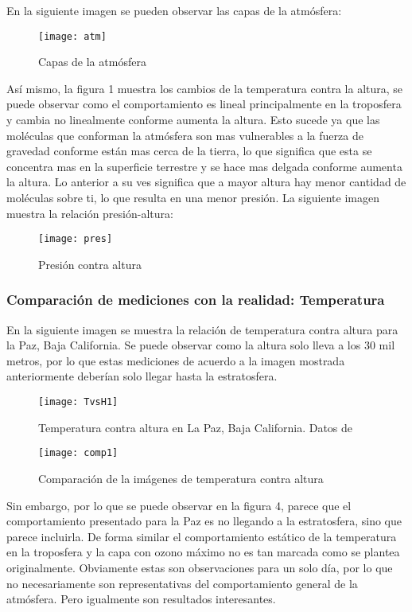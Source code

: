 \documentclass[12pt,letterpaper]{article}
\begin{document}
En la siguiente imagen se pueden observar las capas de la atmósfera:

\begin{figure}[H]
	\centering
	\texttt{[image: atm]}
	\caption{Capas de la atmósfera \cite{a}}
\end{figure}

Así mismo, la figura 1 muestra los cambios de la temperatura contra la altura, se puede observar como el comportamiento es lineal principalmente en la troposfera y cambia no linealmente conforme aumenta la altura. Esto sucede ya que las moléculas que conforman la atmósfera son mas vulnerables a la fuerza de gravedad conforme están mas cerca de la tierra, lo que significa que esta se concentra mas en la superficie terrestre y se hace mas delgada conforme aumenta la altura\cite{a}. Lo anterior a su ves significa que a mayor altura hay menor cantidad de moléculas sobre ti, lo que resulta en una menor presión\cite{a}. La siguiente imagen muestra la relación presión-altura:\\

\begin{figure}[H]
	\centering
	\texttt{[image: pres]}
	\caption{Presión contra altura \cite{a}}
\end{figure}

\subsubsection{Comparación de mediciones con la realidad: Temperatura}
En la siguiente imagen se muestra la relación de temperatura contra altura para la Paz, Baja California. Se puede observar como la altura solo lleva a los 30 mil metros, por lo que estas mediciones de acuerdo a la imagen mostrada anteriormente deberían solo llegar hasta la estratosfera. \\

\begin{figure}[H]
	\centering
	\texttt{[image: TvsH1]}
	\caption{Temperatura contra altura en La Paz, Baja California. Datos de\cite{a}}
\end{figure}


\begin{figure}[H]
	\centering
	\texttt{[image: comp1]}
	\caption{Comparación de la imágenes de temperatura contra altura\cite{a}}
\end{figure}

Sin embargo, por lo que se puede observar en la figura 4, parece que el comportamiento presentado para la Paz es no llegando a la estratosfera, sino que parece incluirla. De forma similar el comportamiento estático de la temperatura en la troposfera y la capa con ozono máximo no es tan marcada como se plantea originalmente.  Obviamente estas son observaciones para un solo día, por lo que no necesariamente son representativas del comportamiento general de la atmósfera. Pero igualmente son resultados interesantes.
\end{document}
